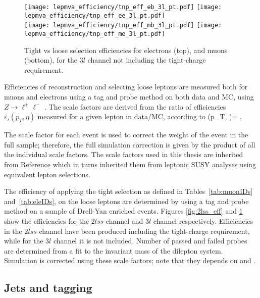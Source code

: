 \begin{figure}[!hb]
\centering
  \texttt{[image: lepmva\_efficiency/tnp\_eff\_eb\_3l\_pt.pdf]}
  \texttt{[image: lepmva\_efficiency/tnp\_eff\_ee\_3l\_pt.pdf]}\\
  \texttt{[image: lepmva\_efficiency/tnp\_eff\_mb\_3l\_pt.pdf]}
  \texttt{[image: lepmva\_efficiency/tnp\_eff\_me\_3l\_pt.pdf]}
\caption[Tight vs loose lepton selection efficiencies in the $3l$ channel.]{Tight vs loose selection efficiencies for electrons (top), and muons (bottom), for the $3l$ channel not including the tight-charge requirement.}
\label{fig:3l_eff}
\end{figure}

Efficiencies of reconstruction and selecting loose leptons are measured both for muons and electrons using a tag and probe method on both data and MC, using $Z\rightarrow\ell^{+}\ell^{-}$ \cite{tnp}. The scale factors are derived from the ratio of efficiencies $\varepsilon_{i}(p_T, \eta)$ measured for a given lepton in data/MC, according to 
\beqn
\rho(p_T, \eta)= .
\eeqn

The scale factor for each event is used to correct the weight of the event in the full sample; therefore, the full simulation correction is given by the product of all the individual scale factors. The scale factors used in this thesis are inherited from Reference \cite{CMS_AN_2017-029} which in turns inherited them from leptonic SUSY analyses using equivalent lepton selections.

The efficiency of applying the tight selection as defined in Tables~\ref{tab:muonIDs} and~\ref{tab:eleIDs}, on the loose leptons are determined by using a tag and probe method on a sample of Drell-Yan enriched events. Figures \ref{fig:2lss_eff} and \ref{fig:3l_eff} show the efficiencies for the $2lss$ channel and $3l$ channel respectively. Efficiencies in the $2lss$ channel have been produced including the tight-charge requirement, while for the $3l$ channel it is not included. Number of passed and failed probes are determined from a fit to the invariant mass of the dilepton system. Simulation is corrected using these scale factors; note that they depends on \etac and \pt.   

\subsection{Jets and \bjet tagging}

